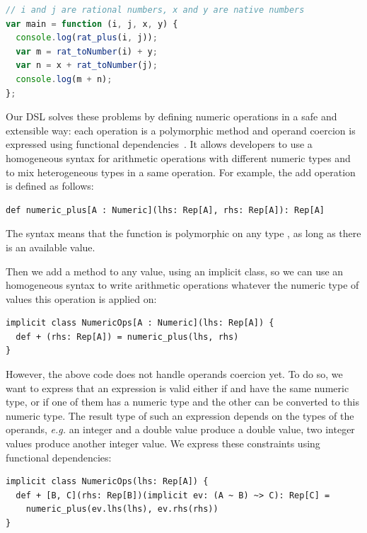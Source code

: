 \documentclass[american,english,runningheads]{llncs}
\newcommand{\eg}{\emph{e.g.}}
\begin{document}
\begin{lstlisting}[language=JavaScript,label=type-coercion,caption=Mixing integer and floating-point arithmetic in
JavaScript.]
// i and j are rational numbers, x and y are native numbers
var main = function (i, j, x, y) {
  console.log(rat_plus(i, j));
  var m = rat_toNumber(i) + y;
  var n = x + rat_toNumber(j);
  console.log(m + n);
};
\end{lstlisting}


Our DSL solves these problems by defining numeric operations in a safe and extensible way: each operation is a
polymorphic method and operand coercion is expressed using functional dependencies~\cite{Jones00_FunDeps}. It allows
developers to use a homogeneous syntax for arithmetic operations with different numeric types and to mix
heterogeneous types in a same operation. For example, the add operation is defined as follows:

\begin{lstlisting}
def numeric_plus[A : Numeric](lhs: Rep[A], rhs: Rep[A]): Rep[A]
\end{lstlisting}

The  syntax means that the function is polymorphic on any type , as long as there is an
available  value.

Then we add a \code{+} method to any  value, using an implicit class, so we can use an homogeneous
syntax to write arithmetic operations whatever the numeric type of values this operation is applied on:

\begin{lstlisting}
implicit class NumericOps[A : Numeric](lhs: Rep[A]) {
  def + (rhs: Rep[A]) = numeric_plus(lhs, rhs)
}
\end{lstlisting}

However, the above code does not handle operands coercion yet. To do so, we want to express that an expression
 is valid either if  and  have the same numeric type, or if one of them has a numeric
type and the other can be converted to this numeric type. The result type of such an expression depends on the types
of the operands, \eg{} an integer and a double value produce a double value, two integer values produce another
integer value. We express these constraints using functional dependencies:

\begin{lstlisting}
implicit class NumericOps(lhs: Rep[A]) {
  def + [B, C](rhs: Rep[B])(implicit ev: (A ~ B) ~> C): Rep[C] =
    numeric_plus(ev.lhs(lhs), ev.rhs(rhs))
}
\end{lstlisting}
\end{document}
